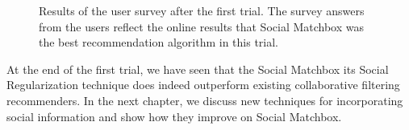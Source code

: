 \begin{figure}[h]
\caption{Results of the user survey after the first trial. The survey answers from the users reflect the online results that Social Matchbox was the best recommendation algorithm in this trial.}
\end{figure}

At the end of the first trial, we have seen that the Social Matchbox its Social Regularization technique does indeed outperform existing collaborative filtering recommenders. In the next chapter, we discuss new techniques for incorporating social information and show how they improve on Social Matchbox.
